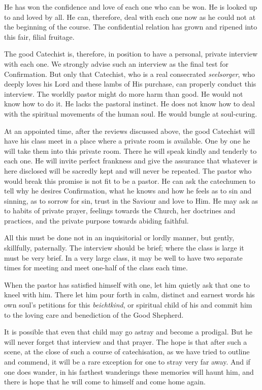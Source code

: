 He has won the confidence and love of each one who can be won. He is looked up to and loved by all. He can, therefore, deal with each one now as he could not at the beginning of the course. The confidential relation has grown and ripened into this fair, filial fruitage.

 The good Catechist is, therefore, in position to have a personal, private interview with each one. We strongly advise such an interview as the final test for Confirmation. But only that Catechist, who is a real consecrated \emph{seelsorger}, who deeply loves his Lord and these lambs of His purchase, can properly conduct this interview. The worldly pastor might do more harm than good. He would not know how to do it. He lacks the pastoral instinct. He does not know how to deal with the spiritual movements of the human soul. He would bungle at soul-curing.

At an appointed time, after the reviews discussed above, the good Catechist will have his class meet in a place where a private room is available. One by one he will take them into this private room. There he will speak kindly and tenderly to each one. He will invite perfect frankness and give the assurance that whatever is here disclosed will be sacredly kept and will never be repeated. The pastor who
would break this promise is not fit to be a pastor. He can ask the catechumen to tell why he desires Confirmation, what he knows and how he feels as to sin and sinning, as to sorrow for sin, trust in the Saviour and love to Him. He may ask as to habits of private prayer, feelings towards the Church, her doctrines and practices, and the private purpose towards abiding faithful.

All this must be done not in an inquisitorial or lordly manner, but gently, skillfully, paternally. The interview should be brief; where the class is large it must be very brief. In a very large class, it may be well to have two separate times for meeting and meet one-half of the class each time.

When the pastor has satisfied himself with one, let him quietly ask that one to kneel with him. There let him pour forth in calm, distinct and earnest words his own soul’s petitions for this \emph{beichtkind}, or spiritual child of his and commit him to the loving care and benediction of the Good Shepherd.

It is possible that even that child may go astray and become a prodigal. But he will never forget that interview and that prayer. The hope is that after such a scene, at the close of such a course of catechisation, as we have tried to outline and commend, it will be a rare exception for one to stray very far away. And if one does wander, in his
farthest wanderings these memories will haunt him, and there is hope that he will come to himself and come home again.

